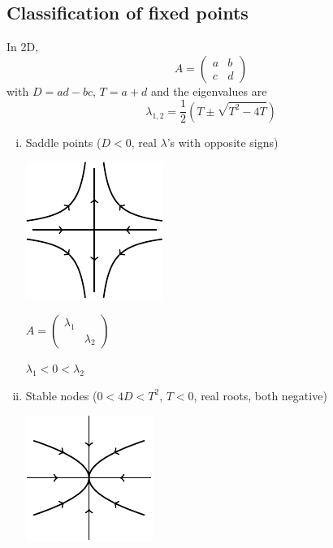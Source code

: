 \documentclass{article}
\begin{document}
\subsection{Classification of fixed points}
In 2D, 
\[ A = \left( \begin{array}{cc}
		a & b \\
		c & d \end{array} \right) \]
with $D = ad - bc$, $T = a+d$ and the eigenvalues are
\[ \lambda_{1,2} = \frac{1}{2}(T \pm \sqrt{T^2 - 4T}) \]
\begin{enumerate}[(i)]
\item Saddle points ($D<0$, real $\lambda$'s with opposite signs)
\\
\begin{minipage}[c][0.25\textwidth][c]{0.25\textwidth}
\includegraphics{Fig6.pdf}
\end{minipage}
\begin{minipage}[c][0.25\textwidth][c]{0.25\textwidth}
 $ A = \left( \begin{array}{cc}
		\lambda _1 &  \\
		 & \lambda _2 \end{array} \right) $ 
\end{minipage}
\begin{minipage}[c][0.25\textwidth][c]{0.25\textwidth}
$ \lambda_1 < 0 <\lambda_2 $ 
\end{minipage}
%
\item Stable nodes ($0< 4D < T^2$, $T<0$, real roots, both negative)
\\
\begin{minipage}[c][0.25\textwidth][c]{0.25\textwidth}
\includegraphics{Fig7.pdf}

\end{minipage}
\end{enumerate}
\end{document}
